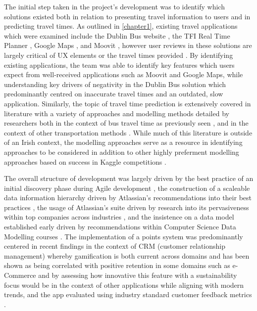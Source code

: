 \documentclass[]{UCD_CS_47360_Report}
\begin{document}
The initial step taken in the project's development was to identify which solutions existed both in relation to presenting travel information to users and in predicting travel times. As outlined in \ref{chapter1}, existing travel applications which were examined include the Dublin Bus website \cite{DublinBus-Schedule}, the TFI Real Time Planner \cite{TFI-App}, Google Maps \cite{GoogleMaps-App}, and Moovit \cite{Moovit-App}, however user reviews in these solutions are largely critical of UX elements or the travel times provided \cite{TFI-Review} \cite{GoogleMaps-Review} \cite{Moovit-Review}. By identifying existing applications, the team was able to identify key features which users expect from well-received applications such as Moovit and Google Maps, while understanding key drivers of negativity in the Dublin Bus solution which predominantly centred on inaccurate travel times and an outdated, slow application. Similarly, the topic of travel time prediction is extensively covered in literature with a variety of approaches and modelling methods detailed by researchers both in the context of bus travel time as previously seen \cite{Yu:2018} \cite{Petersen_2019} \cite{SVM} \cite{RF}, and in the context of other transportation methods \cite{XGB-Taxi}. While much of this literature is outside of an Irish context, the modelling approaches serve as a resource in identifying approaches to be considered in addition to other highly preferment modelling approaches based on success in Kaggle competitions \cite{XGB}.

The overall structure of development was largely driven by the best practice of an initial discovery phase during Agile development \cite{GOV}, the construction of a scaleable data information hierarchy driven by Atlassian's recommendations into their best practices \cite{Confluence-BP}, the usage of Atlassian's suite driven by research into its pervasiveness within top companies across industries \cite{AtlassianUsage}, and the insistence on a data model established early driven by recommendations within Computer Science Data Modelling courses \cite{DataModel}. The implementation of a points system was predominantly centered in recent findings in the context of CRM (customer relationship management) whereby gamification is both current across domains \cite{Gamification-Retention} and has been shown as being correlated with positive retention in some domains such as e-Commerce \cite{Gamification-Retention-2} and by assessing how innovative this feature with a sustainability focus would be in the context of other applications while aligning with modern trends, and the app evaluated using industry standard customer feedback metrics \cite{CSAT} \cite{NPS}.
\end{document}
